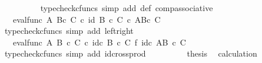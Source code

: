 \begin{isabellebody}
\ \ \ \ \ \ \ \ \isamarkupfalse%
\ {\isacharparenleft}{\kern0pt}typecheck{\isacharunderscore}{\kern0pt}cfuncs{\isacharcomma}{\kern0pt}\ simp\ add{\isacharcolon}{\kern0pt}\ {\isasymphi}{\isacharunderscore}{\kern0pt}def\ comp{\isacharunderscore}{\kern0pt}associative{}{\isacharparenright}{\kern0pt}\ \ \isanewline
\ \ \ \ \ \ \isamarkupfalse%
\ \isamarkupfalse%
\ {\isachardoublequoteopen}{\isachardot}{\kern0pt}{\isachardot}{\kern0pt}{\isachardot}{\kern0pt}\ {\isacharequal}{\kern0pt}\ eval{\isacharunderscore}{\kern0pt}func\ A\ {\isacharparenleft}{\kern0pt}B{\isasymtimes}\isactrlsub c\ C{\isacharparenright}{\kern0pt}\ {\isasymcirc}\isactrlsub c\ id\ {\isacharparenleft}{\kern0pt}{\isacharparenleft}{\kern0pt}B\ {\isasymtimes}\isactrlsub c\ C{\isacharparenright}{\kern0pt}\ {\isasymtimes}\isactrlsub c\ {\isacharparenleft}{\kern0pt}A\isactrlbsup {\isacharparenleft}{\kern0pt}B{\isasymtimes}\isactrlsub c\ C{\isacharparenright}{\kern0pt}\isactrlesup {\isacharparenright}{\kern0pt}{\isacharparenright}{\kern0pt}{\isachardoublequoteclose}\isanewline
\ \ \ \ \ \ \ \ \isamarkupfalse%
\ {\isacharparenleft}{\kern0pt}typecheck{\isacharunderscore}{\kern0pt}cfuncs{\isacharcomma}{\kern0pt}\ simp\ add{\isacharcolon}{\kern0pt}\ left{\isacharunderscore}{\kern0pt}right{\isacharparenright}{\kern0pt}\isanewline
\ \ \ \ \ \ \isamarkupfalse%
\ \isamarkupfalse%
\ {\isachardoublequoteopen}{\isachardot}{\kern0pt}{\isachardot}{\kern0pt}{\isachardot}{\kern0pt}\ {\isacharequal}{\kern0pt}\ eval{\isacharunderscore}{\kern0pt}func\ A\ {\isacharparenleft}{\kern0pt}B\ {\isasymtimes}\isactrlsub c\ C{\isacharparenright}{\kern0pt}\ {\isasymcirc}\isactrlsub c\ id\isactrlsub c\ {\isacharparenleft}{\kern0pt}B\ {\isasymtimes}\isactrlsub c\ C{\isacharparenright}{\kern0pt}\ {\isasymtimes}\isactrlsub f\ id\isactrlsub c\ {\isacharparenleft}{\kern0pt}A\isactrlbsup {\isacharparenleft}{\kern0pt}B\ {\isasymtimes}\isactrlsub c\ C{\isacharparenright}{\kern0pt}\isactrlesup {\isacharparenright}{\kern0pt}{\isachardoublequoteclose}\isanewline
\ \ \ \ \ \ \ \ \isamarkupfalse%
\ {\isacharparenleft}{\kern0pt}typecheck{\isacharunderscore}{\kern0pt}cfuncs{\isacharcomma}{\kern0pt}\ simp\ add{\isacharcolon}{\kern0pt}\ id{\isacharunderscore}{\kern0pt}cross{\isacharunderscore}{\kern0pt}prod{\isacharparenright}{\kern0pt}\isanewline
\ \ \ \ \ \ \isamarkupfalse%
\ \isamarkupfalse%
\ {\isacharquery}{\kern0pt}thesis\ \isamarkupfalse%
\ calculation\ \isamarkupfalse%

\end{isabellebody}
